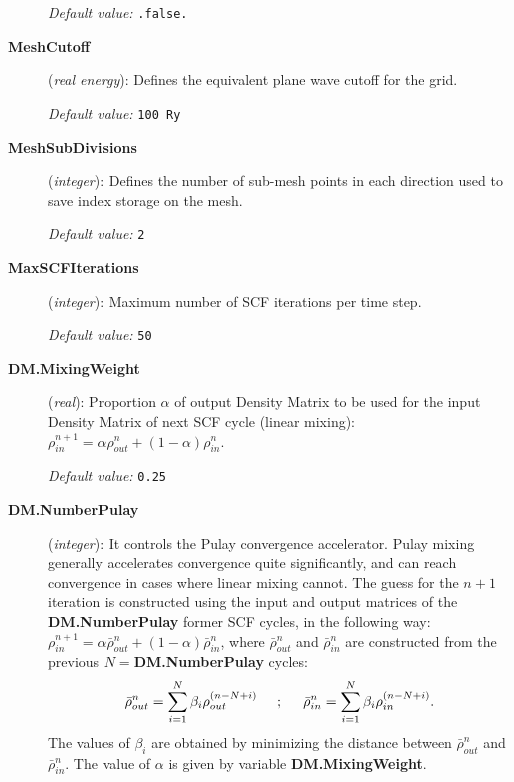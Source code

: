 \documentclass[11pt]{article}
\begin{document}
\begin{description}
{\it Default value:} {\tt .false.}

\item[{\bf MeshCutoff}] ({\it real energy}): 
Defines the equivalent plane wave cutoff for the grid.

{\it Default value:} {\tt 100 Ry}

\item[{\bf MeshSubDivisions}] ({\it integer}): 
Defines the number of sub-mesh points in each direction used
to save index storage on the mesh.

{\it Default value:} {\tt 2}

\item[{\bf MaxSCFIterations}] ({\it integer}): 
Maximum number of SCF iterations per time step.

{\it Default value:} {\tt 50}

\item[{\bf DM.MixingWeight}] ({\it real}):
Proportion $\alpha$ of 
output Density Matrix to be used for the input Density Matrix of 
next SCF cycle (linear mixing):
$\rho^{n+1}_{in} = \alpha \rho^{n}_{out} 
+(1 - \alpha) \rho^{n}_{in}$.

{\it Default value:} {\tt 0.25}

\item[{\bf DM.NumberPulay}] ({\it integer}): 
It controls the Pulay convergence accelerator. Pulay mixing generally
accelerates convergence quite significantly, and can
reach convergence in cases where linear mixing cannot.
The guess for the $n+1$ iteration is constructed using the
input and output matrices of the {\bf DM.NumberPulay} former
SCF cycles, in the following way:
$\rho^{n+1}_{in} = \alpha \bar{\rho}^{n}_{out} 
+(1 - \alpha) \bar{\rho}^{n}_{in}$, where $\bar{\rho}^{n}_{out}$
and $\bar{\rho}^{n}_{in}$ are constructed from the previous
$N=${\bf DM.NumberPulay} cycles:
%
\begin{equation}
\bar{\rho}^{n}_{out} = \sum_{i=1}^N
\beta_i \rho_{out}^{(n-N+i)} \hspace{0.5truecm}; \hspace{0.5truecm}
\bar{\rho}^{n}_{in} = \sum_{i=1}^N
\beta_i \rho_{in}^{(n-N+i)}.
\nonumber
\end{equation}
%
The values of $\beta_i$ are obtained by minimizing the distance
between $\bar{\rho}^{n}_{out}$ and $\bar{\rho}^{n}_{in}$.
The value of $\alpha$ is given by variable {\bf DM.MixingWeight}.


\end{description}
\end{document}
